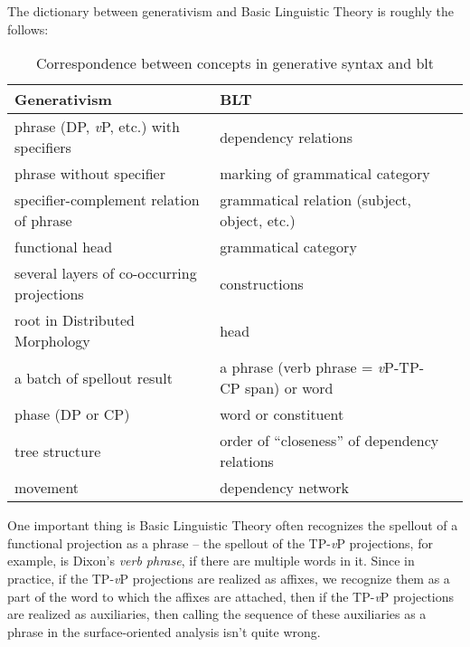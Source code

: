 \documentclass[UTF8, a4paper, oneside, scheme=plain]{ctexrep}
\newcommand*{\term}[1]{\emph{#1}}
\newcommand{\vP}{\textit{v}P}
\begin{document}
The dictionary between generativism and Basic Linguistic Theory is roughly the follows:
\begin{table}[H]
    \caption*{Correspondence between concepts in generative syntax and \acs{blt}}
    \centering
    \begin{tabular}{@{}lll@{}}
    \toprule
    Generativism                               & BLT                                          \\ \midrule
    phrase (DP, \vP, etc.) with specifiers     & dependency relations                          \\
    phrase without specifier                   & marking of grammatical category               \\
    specifier-complement relation of phrase    & grammatical relation (subject, object, etc.)  \\
    functional head                            & grammatical category                          \\
    several layers of co-occurring projections & constructions                                 \\
    root in Distributed Morphology             & head                                          \\
    a batch of spellout result                 & a phrase (verb phrase = \vP-TP-CP span) or word    \\
    phase (DP or CP)                           & word or constituent                           \\
    tree structure                             & order of ``closeness'' of dependency relations  \\
    movement                                   & dependency network                            \\ \bottomrule
    \end{tabular}
\end{table}

One important thing is Basic Linguistic Theory often recognizes 
the spellout of a functional projection 
as a phrase -- 
the spellout of the TP-\vP{} projections, 
for example, is Dixon's \term{verb phrase}, 
if there are multiple words in it.
Since in practice, if the TP-\vP{} projections are realized as affixes, 
we recognize them as a part of the word to which the affixes are attached,
then if the TP-\vP{} projections are realized as auxiliaries,
then calling the sequence of these auxiliaries as a phrase in the surface-oriented analysis 
isn't quite wrong.
\end{document}

